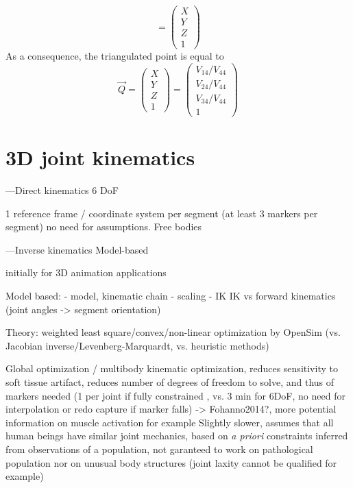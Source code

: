 \begin{algorithm}
\begin{algorithmic}[1]
\begin{equation}
          = \begin{pmatrix}X \\Y \\Z \\1\end{pmatrix}
      \end{equation} 
      \STATE As a consequence, the triangulated point is equal to
      \begin{equation}
          \overrightarrow{Q}=\begin{pmatrix}X \\Y \\Z \\1\end{pmatrix} = \begin{pmatrix}V_{14}/V_{44} \\V_{24}/V_{44} \\V_{34}/V_{44} \\1\end{pmatrix}
      \end{equation}
      \end{algorithmic}
\end{algorithm}




\section{3D joint kinematics}\label{sec:3D joint kin}


---Direct kinematics
6 DoF 

1 reference frame / coordinate system per segment (at least 3 markers per segment) \cite{Wu2002, Wu2005}
no need for assumptions. Free bodies



---Inverse kinematics 
Model-based

initially for 3D animation applications

Model based:
- model, kinematic chain
- scaling
- IK
IK vs forward kinematics (joint angles -> segment orientation)


Theory: weighted least square/convex/non-linear optimization by OpenSim (vs. Jacobian inverse/Levenberg-Marquardt, vs. heuristic methods)


Global optimization / multibody kinematic optimization, reduces sensitivity to soft tissue artifact, reduces number of degrees of freedom to solve, and thus of markers needed (1 per joint if fully constrained \cite{Slater2018}, vs. 3 min for 6DoF, no need for interpolation or redo capture if marker falls) -> Fohanno2014?, more potential information on muscle activation for example \cite{Robinson2013,Kainz2016}
Slightly slower, assumes that all human beings have similar joint mechanics, based on \textit{a priori} constraints inferred from observations of a population, not garanteed to work on pathological population nor on unusual body structures (joint laxity cannot be qualified for example)

